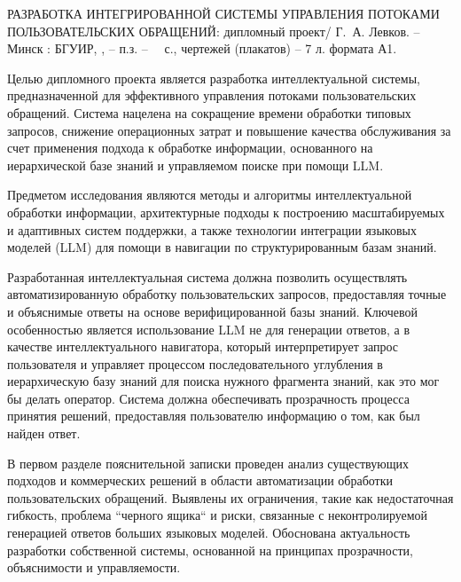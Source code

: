 \thispagestyle{empty}

\MakeUppercase{Разработка интегрированной системы управления потоками пользовательских обращений}: дипломный проект/ Г.~А. Левков. -- Минск : БГУИР, \the\year{}, -- п.з. -- ~\pageref*{LastPage}~с., чертежей (плакатов) -- 7 л. формата А1.

\vspace{4\parsep}


Целью дипломного проекта является разработка интеллектуальной системы, предназначенной для эффективного управления потоками пользовательских обращений. Система нацелена на сокращение времени обработки типовых запросов, снижение операционных затрат и повышение качества обслуживания за счет применения подхода к обработке информации, основанного на иерархической базе знаний и управляемом поиске при помощи LLM.

Предметом исследования являются методы и алгоритмы интеллектуальной обработки информации, архитектурные подходы к построению масштабируемых и адаптивных систем поддержки, а также технологии интеграции языковых моделей (LLM) для помощи в навигации по структурированным базам знаний.

Разработанная интеллектуальная система должна позволить осуществлять автоматизированную обработку пользовательских запросов, предоставляя точные и объяснимые ответы на основе верифицированной базы знаний. Ключевой особенностью является использование LLM не для генерации ответов, а в качестве интеллектуального навигатора, который интерпретирует запрос пользователя и управляет процессом последовательного углубления в иерархическую базу знаний для поиска нужного фрагмента знаний, как это мог бы делать оператор. Система должна обеспечивать прозрачность процесса принятия решений, предоставляя пользователю информацию о том, как был найден ответ.

В первом разделе пояснительной записки проведен анализ существующих подходов и коммерческих решений в области автоматизации обработки пользовательских обращений. Выявлены их ограничения, такие как недостаточная гибкость, проблема ``черного ящика`` и риски, связанные с неконтролируемой генерацией ответов больших языковых моделей. Обоснована актуальность разработки собственной системы, основанной на принципах прозрачности, объяснимости и управляемости.


